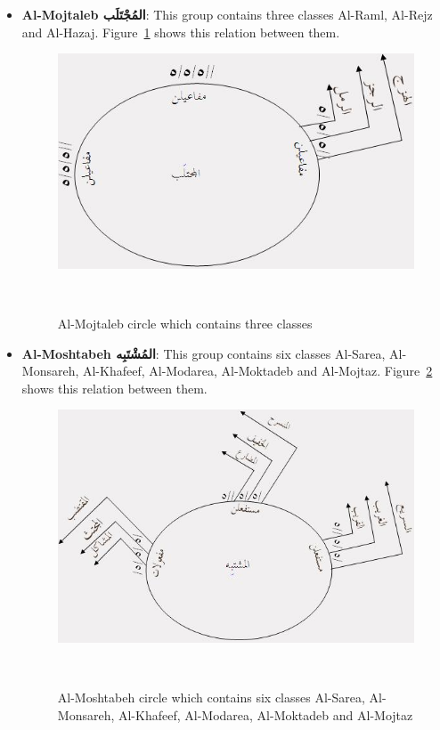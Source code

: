 \begin{itemize}
\item \textbf{Al-Mojtaleb \textarabic{المُجْتَلَب}}: This group contains three classes Al-Raml, Al-Rejz and Al-Hazaj. Figure~\ref{fig:Circle_Mojtaleb} shows this relation between them.

\begin{figure}[H]
\includegraphics{./Figures/Ch_2_Background/Mojtaleb.jpg}
\caption{Al-Mojtaleb circle which contains three classes }~\label{fig:Circle_Mojtaleb}
\end{figure}


\item \textbf{Al-Moshtabeh \textarabic{المُشْتَبِه}}: This group contains six classes Al-Sarea, Al-Monsareh, Al-Khafeef, Al-Modarea, Al-Moktadeb and Al-Mojtaz. Figure~\ref{fig:Circle_AlMoshtabeh} shows this relation between them.

\begin{figure}[H]
\includegraphics{./Figures/Ch_2_Background/Al-Moshtabeh.jpg}
\caption{Al-Moshtabeh circle which contains six classes Al-Sarea, Al-Monsareh, Al-Khafeef, Al-Modarea, Al-Moktadeb and Al-Mojtaz }~\label{fig:Circle_AlMoshtabeh}
\end{figure}



\end{itemize}
